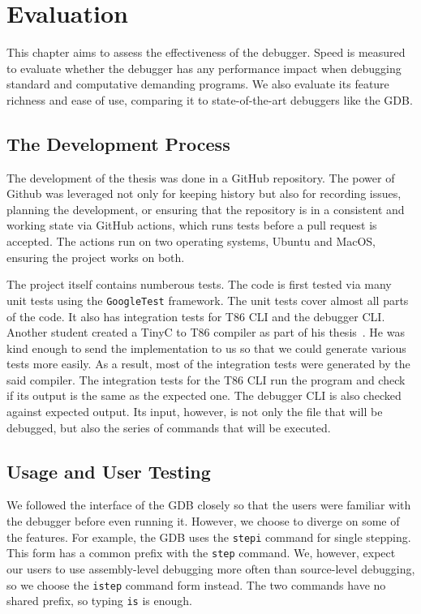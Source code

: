 \chapter{Evaluation}
This chapter aims to assess the effectiveness of the debugger. Speed is
measured to evaluate whether the debugger has any performance impact when
debugging standard and computative demanding programs. We also evaluate its
feature richness and ease of use, comparing it to state-of-the-art debuggers
like the GDB.

\section{The Development Process}
The development of the thesis was done in a GitHub repository. The power of
Github was leveraged not only for keeping history but also for recording
issues, planning the development, or ensuring that the repository is in a
consistent and working state via GitHub actions, which runs tests before a pull
request is accepted. The actions run on two operating systems, Ubuntu and
MacOS, ensuring the project works on both.

The project itself contains numberous tests. The code is first tested via many
unit tests using the \texttt{GoogleTest} framework. The unit
tests cover almost all parts of the code. It also has integration tests for T86
CLI and the debugger CLI. Another student created a TinyC to T86 compiler as
part of his thesis~\cite{martintinyc}. He was kind enough to send the
implementation to us so that we could generate various tests more easily. As a
result, most of the integration tests were generated by the said compiler. The
integration tests for the T86 CLI run the program and check if its output is
the same as the expected one. The debugger CLI is also checked against expected
output. Its input, however, is not only the file that will be debugged, but
also the series of commands that will be executed.

\section{Usage and User Testing}
We followed the interface of the GDB closely so that the users were familiar
with the debugger before even running it. However, we choose to diverge on some
of the features. For example, the GDB uses the \texttt{stepi} command for
single stepping. This form has a common prefix with the \texttt{step} command.
We, however, expect our users to use assembly-level debugging more often than
source-level debugging, so we choose the \texttt{istep} command form instead.
The two commands have no shared prefix, so typing \texttt{is} is enough.


